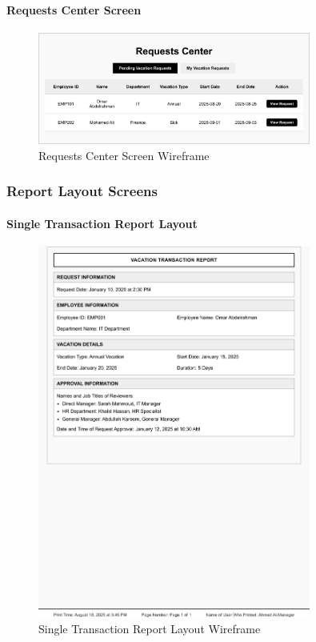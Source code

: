 \documentclass[12pt,a4paper]{article}
\begin{document}
\paragraph{Requests Center Screen}
\begin{figure}[H]
\centering
\includegraphics[width=0.8\textwidth]{Wireframes/Requests-Center/Requests-Center-1.png}
\caption{Requests Center Screen Wireframe}
\label{fig:wireframe-requests-center}
\end{figure}

\subsubsection{Report Layout Screens}

\paragraph{Single Transaction Report Layout}
\begin{figure}[H]
\centering
\includegraphics[width=0.8\textwidth]{Wireframes/Print-Layout-Single-Transaction-Report/Print-Layout-Single-Transaction-Report-1.png}
\caption{Single Transaction Report Layout Wireframe}
\label{fig:wireframe-single-transaction-report}
\end{figure}
\end{document}
